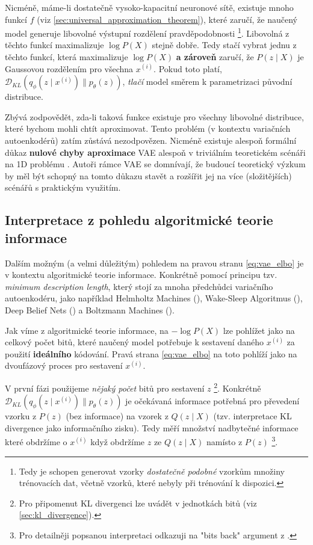 Nicméně, máme-li dostatečně vysoko-kapacitní neuronové sítě, existuje mnoho funkcí $f$ (viz \autoref{sec:universal_approximation_theorem}), které zaručí, že naučený model generuje libovolné výstupní rozdělení pravděpodobnosti
\footnote{Tedy je schopen generovat vzorky \emph{dostatečně podobné} vzorkům množiny trénovacích dat, včetně vzorků, které nebyly při trénování k dispozici.}.
Libovolná z těchto funkcí maximalizuje $\log P(X)$ stejně dobře. Tedy stačí vybrat jednu z těchto funkcí, která maximalizuje $\log P(X)$ \textbf{a zároveň} zaručí, že $P (z\mid X)$ je Gaussovou rozdělením pro všechna $x^{(i)}$.
Pokud toto platí, $\mathcal{D}_{KL}(q_\phi(z\mid x^{(i)})\parallel p_\theta(z))$, \emph{tlačí} model směrem k parametrizaci původní distribuce. \cite{Doersch2021}

Zbývá zodpovědět, zda-li taková funkce existuje pro všechny libovolné distribuce, které bychom mohli chtít aproximovat.
Tento problém (v kontextu variačních autoenkodérů) zatím zůstává nezodpovězen. Nicméně existuje alespoň formální důkaz \textbf{nulové chyby aproximace} VAE alespoň v triviálním teoretickém scénáři na 1D problému \cite[Příloha A]{Doersch2021}.
Autoři rámce VAE se domnívají, že budoucí teoretický výzkum by měl být schopný na tomto důkazu stavět a rozšířit jej na více (složitějších) scénářů s praktickým využitím. \cite{Doersch2021}

\subsection{Interpretace z pohledu algoritmické teorie informace}
\label{sec:vae_information_theory_interpretation}
Dalším možným (a velmi důležitým) pohledem na pravou stranu \autoref{eq:vae_elbo} je v kontextu algoritmické teorie informace.
Konkrétně pomocí principu tzv. \emph{minimum description length}, který stojí za mnoha předchůdci variačního autoenkodéru, jako například Helmholtz Machines (\cite{Dayan1995}), Wake-Sleep Algoritmus (\cite{Hinton1995}), Deep Belief Nets (\cite{Hinton2006}) a Boltzmann Machines (\cite{Salakhutdinov2010}).

Jak víme z algoritmické teorie informace, na $- \log P(X)$ lze pohlížet jako na celkový počet bitů, které naučený model potřebuje k sestavení daného $x^{(i)}$ za použití \textbf{ideálního} kódování.
Pravá strana \autoref{eq:vae_elbo} na toto pohlíží jako na dvoufázový proces pro sestavení $x^{(i)}$. \cite{Doersch2021}

V první fázi použijeme \emph{nějaký počet} bitů pro sestavení $z$ \footnote{Pro připomenut KL divergenci lze uvádět v jednotkách bitů (viz \autoref{sec:kl_divergence}).}.
Konkrétně $\mathcal{D}_{KL}(q_\phi(z\mid x^{(i)})\parallel p_\theta(z))$ je očekávaná informace potřebná pro převedení vzorku z $P(z)$ (bez informace) na vzorek z $Q(z\mid X)$ (tzv. interpretace KL divergence jako informačního zisku).
Tedy měří množství nadbytečné informace které obdržíme o $x^{(i)}$ když obdržíme $z$ ze $Q(z\mid X)$ namísto z $P(z)$
\footnote{Pro detailněji popsanou interpretaci odkazuji na "bits back" argument z \cite[Sekce 5.2]{Hinton1993}.}. \cite{Doersch2021}

